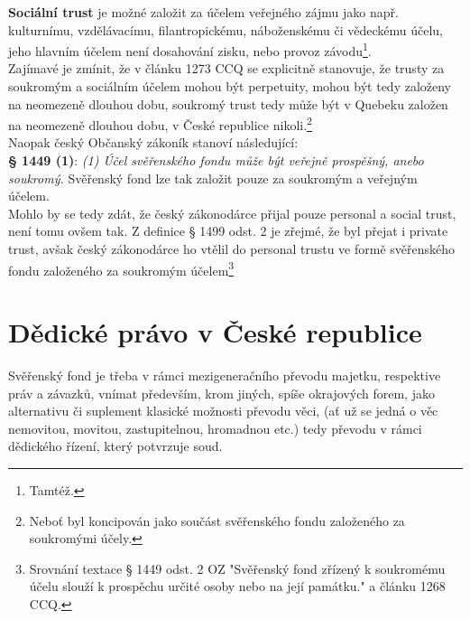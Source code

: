 \documentclass{article}
\begin{document}
\textbf{Sociální trust} je možné založit za účelem veřejného zájmu jako např. kulturnímu, vzdělávacímu, filantropickému, náboženskému či vědeckému účelu, jeho hlavním účelem není dosahování zisku, nebo provoz závodu\footnote{Tamtéž.}.\\

Zajímavé je zmínit, že v článku 1273 CCQ se explicitně stanovuje, že trusty za soukromým a sociálním účelem mohou být perpetuity, mohou být tedy založeny na neomezeně dlouhou dobu, soukromý trust tedy může být v Quebeku založen na neomezeně dlouhou dobu, v České republice nikoli.\footnote{Neboť byl koncipován jako součást svěřenského fondu založeného za soukromými účely.}\\

Naopak český Občanský zákoník stanoví následující:\\


\textbf{§ 1449 (1)}:
\textit{(1) Účel svěřenského fondu může být veřejně prospěšný, anebo soukromý.} Svěřenský fond lze tak založit pouze za soukromým a veřejným účelem.\\

Mohlo by se tedy zdát, že český zákonodárce přijal pouze personal a social trust, není tomu ovšem tak. Z definice § 1499 odst. 2 je zřejmé, že byl přejat i private trust, avšak český zákonodárce ho vtělil do personal trustu ve formě svěřenského fondu založeného za soukromým účelem\footnote{Srovnání textace § 1449 odst. 2 OZ "Svěřenský fond zřízený k soukromému účelu slouží k prospěchu určité osoby nebo na její památku." a článku 1268 CCQ.}\\


\newpage
\section{Dědické právo v České republice}

Svěřenský fond je třeba v rámci mezigeneračního převodu majetku, respektive práv a závazků, vnímat především, krom jiných, spíše okrajových forem, jako alternativu či suplement klasické možnosti převodu věci, (ať už se jedná o věc nemovitou, movitou, zastupitelnou, hromadnou etc.) tedy převodu v rámci dědického řízení, který potvrzuje soud.\\
\end{document}
